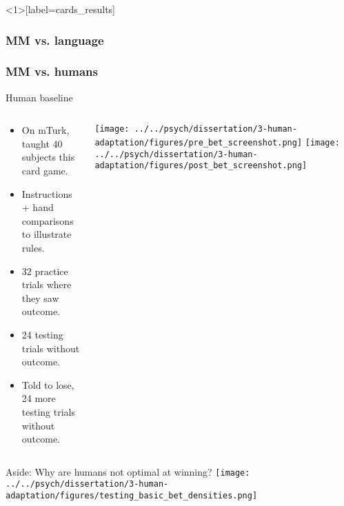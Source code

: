 \documentclass{beamer}
\begin{document}


\begin{frame}<1>[label=cards_results]
\frametitle<1>{MM vs. language}
\frametitle<2->{MM vs. humans}
\end{frame}

\begin{frame}{Human baseline}
\begin{columns}
\begin{column}{0.5\textwidth}
\begin{itemize}
\item On mTurk, taught 40 subjects this card game.
\item Instructions + hand comparisons to illustrate rules.
\item 32 practice trials where they saw outcome.
\item 24 testing trials without outcome.
\item Told to lose, 24 more testing trials without outcome.
\end{itemize}
\end{column}

\begin{column}{0.5\textwidth}
\vspace{1em}
\texttt{[image: ../../psych/dissertation/3-human-adaptation/figures/pre\_bet\_screenshot.png]}
\texttt{[image: ../../psych/dissertation/3-human-adaptation/figures/post\_bet\_screenshot.png]}
\end{column}
\end{columns}

\end{frame}


\begin{frame}{Aside: Why are humans not optimal at winning?}
\centering
\texttt{[image: ../../psych/dissertation/3-human-adaptation/figures/testing\_basic\_bet\_densities.png]}
\end{frame}
\end{document}

